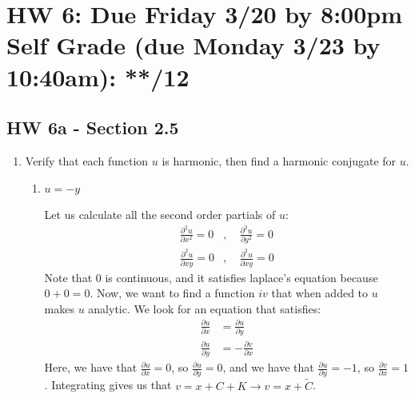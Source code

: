 
\newpage
\newcommand{\prt}[2]{\frac{\partial#1}{\partial#2}}
\newcommand{\prtt}[2]{\frac{\partial^2#1}{\partial#2^2}}
\section*{HW 6: Due Friday 3/20 by 8:00pm \\ Self Grade (due Monday 3/23 by 10:40am): **/12} 
\subsection*{HW 6a - Section 2.5}
\begin{enumerate}
\item Verify that each function $u$ is harmonic, then find a harmonic conjugate for $u$.
\begin{enumerate}
\item $u=-y$
\begin{problem}
	Let us calculate all the second order partials of $u$:
	\begin{align*}
		\prt{^2u}{x^2} = 0&, \quad \prt{^2u}{y^2} = 0\\
		\prt{^2u}{xy} = 0&, \quad\prt{^2u}{xy} =0 
	\end{align*}
	Note that $0$ is continuous, and it satisfies laplace's equation because $0 + 0 = 0$. Now, we want to find a function $iv$ that when added to $u$ makes $u$ analytic. We look for an equation that satisfies:
	\begin{align*}
		\prt{u}{x}  &= \prt{u}{y}\\
		\prt{u}{y} &= -\prt{v}{x}
	\end{align*}
	Here, we have that $\prt{u}x = 0$, so $\prt{u}{y} = 0$, and we have that $\prt{u}{y} = -1$, so $\prt{v}{x} = 1$. Integrating gives us that $v = x + C + K \to v = x + \tilde C$.
\end{problem}


\end{enumerate}
\end{enumerate}

